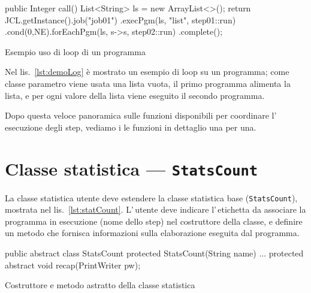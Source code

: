 \begin{elisting}[!htb]
\begin{javacode}
public Integer call() {
    List<String> ls = new ArrayList<>();
    return JCL.getInstance().job("job01")
        .execPgm(ls, "list", step01::run)
        .cond(0,NE).forEachPgm(ls, s->s, step02::run)
        .complete();
}
\end{javacode}
\caption{Esempio uso di loop di un programma}
\label{lst:demoLoop}
\end{elisting}
Nel lis.~\ref{lst:demoLog} è mostrato un esempio di loop su un programma; come
classe parametro viene usata una lista vuota, il primo programma alimenta la
lista, e per ogni valore della lista viene eseguito il secondo programma.

Dopo questa veloce panoramica sulle funzioni disponibili per coordinare
l'\,esecuzione degli step, vediamo i le funzioni in dettaglio una per una.


\section{Classe statistica --- \texttt{StatsCount}}\label{sec:statCount}
La classe statistica utente deve estendere la classe statistica base
(\texttt{StatsCount}), mostrata nel lis.~\ref{lst:statCount}.
L'\,utente deve indicare l'\,etichetta da associare la programma in esecuzione
(nome dello step) nel costruttore della classe, e definire un metodo che
fornisca informazioni sulla elaborazione eseguita dal programma.

\begin{elisting}[!htb]
\begin{javacode}
public abstract class StatsCount {
    protected StatsCount(String name) { ... }
    protected abstract void recap(PrintWriter pw);
}
\end{javacode}
\caption{Costruttore e metodo astratto della classe statistica}
\label{lst:statCount}
\end{elisting}


